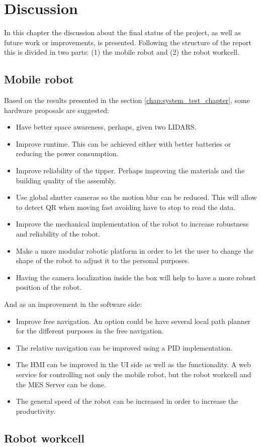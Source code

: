 \chapter{Discussion}
\label{chap:discussion}
In this chapter the discussion about the final status of the project, as well as future work or improvements, is presented.
Following the structure of the report this is divided in two parts: (1) the mobile robot and (2) the robot workcell.

	\section{Mobile robot} %
	\label{sub:mobile_robot}
	Based on the results presented in the section \ref{chap:system_test_chapter}, some hardware proposals are suggested:
	\begin{itemize}
		\item Have better space awareness, perhaps, given two LIDARS.
		\item Improve runtime. This can be achieved either with better batteries or reducing the power consumption.
		\item Improve reliability of the tipper. Perhaps improving the materials and the building quality of the assembly.
		\item Use global shutter cameras so the motion blur can be reduced. This will allow to detect QR when moving fast avoiding have to stop to read the data.
		\item Improve the mechanical implementation of the robot to increase robustness and reliability of the robot.
		\item Make a more modular robotic platform in order to let the user to change the shape of the robot to adjust it to the personal purposes.
		\item Having the camera localization inside the box will help to have a more robust position of the robot.
	\end{itemize}
	And as an improvement in the software side:
	\begin{itemize}
		\item Improve free navigation. An option could be have several local path planner for the different purposes in the free navigation.
		\item The relative navigation can be improved using a PID implementation.
		\item The HMI can be improved in the UI side as well as the functionality. A web service for controlling not only the mobile robot, but the robot workcell and the MES Server can be done.
		\item The general speed of the robot can be increased in order to increase the productivity.
	\end{itemize}

	\section{Robot workcell} %
	\label{sub:robot_workcell}
